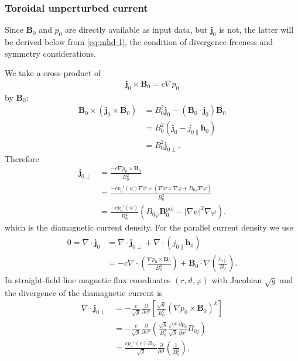 \documentclass[a4paper, 10pt, english]{article}
\let\temp\vartheta
\let\vartheta\theta
\let\theta\temp
\let\temp\varphi
\let\varphi\phi
\let\phi\temp
\let\vec\symbf
\newcommand*\pd[2][]{\ensuremath{\frac{\partial #1}{\partial #2}}}
\newcommand*\pol{\ensuremath{\textrm{pol}}}
\begin{document}
\subsubsection{Toroidal unperturbed current}

Since $\vec{B}_{0}$ and $p_{0}$ are directly available as input data, but $\vec{j}_{0}$ is not, the latter will be derived below from \cref{eq:mhd-1}, the condition of divergence-freeness and symmetry considerations.

We take a cross-product of
\begin{gather}
  \vec{j}_{0} \times \vec{B}_{0} = c \nabla p_{0}
\end{gather}
by $\vec{B}_{0}$:
\begin{align}
  \vec{B}_{0} \times \left( \vec{j}_{0} \times \vec{B}_{0} \right) &= B_{0}^{2} \vec{j}_{0} - (\vec{B}_{0} \cdot \vec{j}_{0}) \vec{B}_{0} \nonumber \\
  &= B_{0}^{2} (\vec{j}_{0} - j_{0 \parallel} \vec{h}_{0}) \nonumber \\
  &= B_{0}^{2} \vec{j}_{0 \perp}.
\end{align}
Therefore
\begin{align}
  \vec{j}_{0 \perp} &= \frac{-c \nabla p_{0} \times \vec{B}_{0}}{B_{0}^{2}} \\
  &= \frac{-c p_{0}' (\psi) \nabla \psi \times (\nabla \psi \times \nabla \phi + B_{0 \phi} \nabla \phi)}{B_{0}^{2}} \nonumber \\
  &= \frac{-c p_{0}' (\psi)}{B_{0}^{2}} \left( B_{0 \phi} \vec{B}_{0}^{\pol} - \lvert \nabla \psi \rvert^{2} \nabla \phi \right).
\end{align}
which is the diamagnetic current density. For the parallel current density we use
\begin{align}
 0 = \nabla \cdot \vec{j}_{0} &= \nabla \cdot \vec{j}_{0 \perp} + \nabla \cdot (j_{0 \parallel} \vec{h}_{0}) \nonumber \\
 &= -c \nabla \cdot \left( \frac{\nabla p_{0} \times \vec{B}_{0}}{B_{0}^{2}} \right) + \vec{B}_{0} \cdot \nabla \left( \frac{j_{0 \parallel}}{B_{0}} \right).
\end{align}
In straight-field line magnetic flux coordinates $(r, \theta, \phi)$ with Jacobian $\sqrt{g}$ and the divergence of the diamagnetic current is
\begin{align}
  \nabla \cdot \vec{j}_{0 \perp} &= -\frac{c}{\sqrt{g}} \pd{x^{k}} \left[ \frac{\sqrt{g}}{B_{0}^{2}} \left( \nabla p_{0} \times \vec{B}_{0} \right)^{k} \right] \nonumber \\
  &= -\frac{c}{\sqrt{g}} \pd{x^{k}} \left( \frac{\sqrt{g}}{B_{0}^{2}} \frac{\varepsilon^{ijk}}{\sqrt{g}} \pd[p_{0}]{x^{i}} B_{0 j} \right) \nonumber \\
  &= \frac{c p_{0}' (r) B_{0 \phi}}{\sqrt{g}} \pd{\theta} \left( \frac{1}{B_{0}^{2}} \right),
\end{align}
\end{document}
